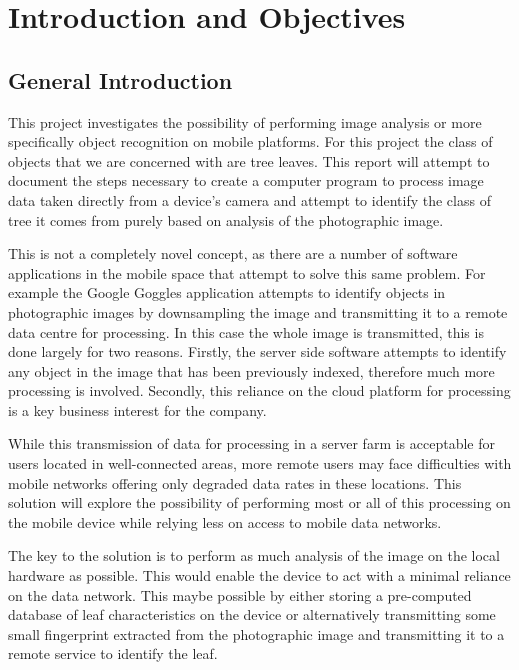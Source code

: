 \chapter{Introduction and Objectives}

\section{General Introduction}
This project investigates the possibility of performing image analysis or more specifically object recognition on mobile platforms. For this project the class of objects that we are concerned with are tree leaves. This report will attempt to document the steps necessary to create a computer program to process image data taken directly from a device's camera and attempt to identify the class of tree it comes from purely based on analysis of the photographic image.

This is not a completely novel concept, as there are a number of software applications in the mobile space that attempt to solve this same problem. For example the Google Goggles\textsuperscript{\texttrademark} application attempts to identify objects in photographic images by downsampling the image and transmitting it to a remote data centre for processing. In this case the whole image is transmitted, this is done largely for two reasons. Firstly, the server side software attempts to identify any object in the image that has been previously indexed, therefore much more processing is involved. Secondly, this reliance on the cloud platform for processing is a key business interest for the company.

While this transmission of data for processing in a server farm is acceptable for users located in well-connected areas, more remote users may face difficulties with mobile networks offering only degraded data rates in these locations. This solution will explore the possibility of performing most or all of this processing on the mobile device while relying less on access to mobile data networks.

The key to the solution is to perform as much analysis of the image on the local hardware as possible. This would enable the device to act with a minimal reliance on the data network. This maybe possible by either storing a pre-computed database of leaf characteristics on the device or alternatively transmitting some small fingerprint extracted from the photographic image and transmitting it to a remote service to identify the leaf.


